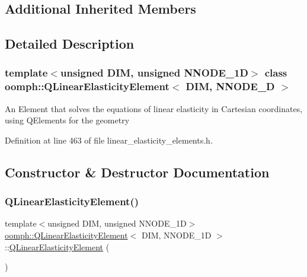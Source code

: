 \subsection*{Additional Inherited Members}


\subsection{Detailed Description}
\subsubsection*{template$<$unsigned D\+IM, unsigned N\+N\+O\+D\+E\+\_\+1D$>$\newline
class oomph\+::\+Q\+Linear\+Elasticity\+Element$<$ D\+I\+M, N\+N\+O\+D\+E\+\_\+D $>$}

An Element that solves the equations of linear elasticity in Cartesian coordinates, using Q\+Elements for the geometry 

Definition at line 463 of file linear\+\_\+elasticity\+\_\+elements.\+h.



\subsection{Constructor \& Destructor Documentation}
\mbox{\label{classoomph_1_1QLinearElasticityElement_a51d460f236a3501e32bc2218877707fd}} 
\subsubsection{\texorpdfstring{Q\+Linear\+Elasticity\+Element()}{QLinearElasticityElement()}}
{\footnotesize\ttfamily template$<$unsigned D\+IM, unsigned N\+N\+O\+D\+E\+\_\+1D$>$ \\
\hyperlink{classoomph_1_1QLinearElasticityElement}{oomph\+::\+Q\+Linear\+Elasticity\+Element}$<$ D\+IM, N\+N\+O\+D\+E\+\_\+1D $>$\+::\hyperlink{classoomph_1_1QLinearElasticityElement}{Q\+Linear\+Elasticity\+Element} (\begin{DoxyParamCaption}{ }\end{DoxyParamCaption})\hspace{0.3cm}{\ttfamily [inline]}}



